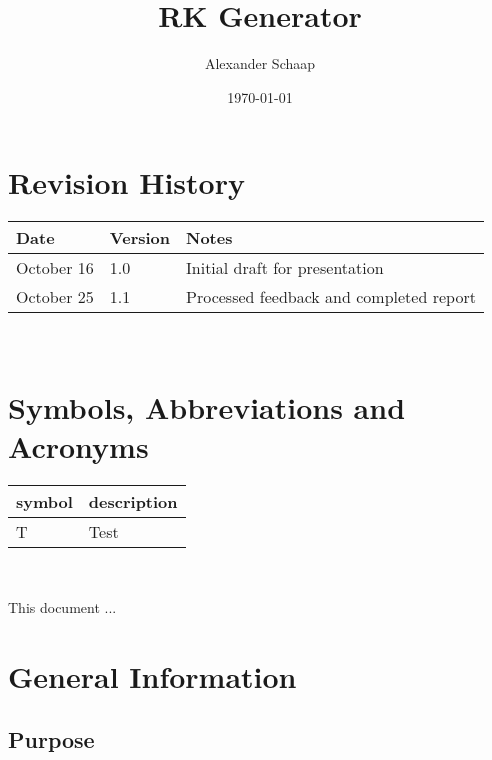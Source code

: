 \documentclass[12pt, titlepage]{article}
\begin{document}
\title{RK Generator} 
\author{Alexander Schaap}
\date{\today}
	
\maketitle


\section{Revision History}

\begin{tabularx}{\textwidth}{p{3cm}p{2cm}X}
\toprule {\bf Date} & {\bf Version} & {\bf Notes}\\
\midrule
October 16 & 1.0 & Initial draft for presentation\\
October 25 & 1.1 & Processed feedback and completed report\\
\bottomrule
\end{tabularx}

~\newpage

\section{Symbols, Abbreviations and Acronyms}

\renewcommand{\arraystretch}{1.2}
\begin{tabular}{l l} 
  \toprule		
  \textbf{symbol} & \textbf{description}\\
  \midrule 
  T & Test\\
  \bottomrule
\end{tabular}\\


\newpage

\tableofcontents

\listoftables

\listoffigures

\newpage


This document ...

\section{General Information}

\subsection{Purpose}
\end{document}
